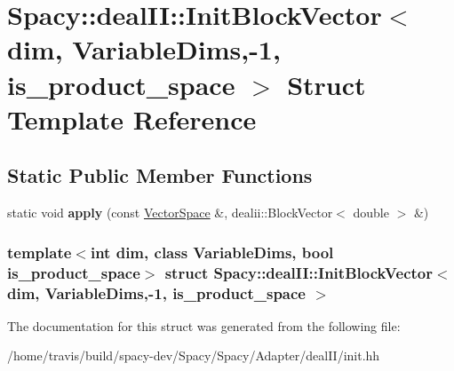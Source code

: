 \hypertarget{structSpacy_1_1dealII_1_1InitBlockVector_3_01dim_00_01VariableDims_00-1_00_01is__product__space_01_4}{\section{\-Spacy\-:\-:deal\-I\-I\-:\-:\-Init\-Block\-Vector$<$ dim, \-Variable\-Dims,-\/1, is\-\_\-product\-\_\-space $>$ \-Struct \-Template \-Reference}
\label{structSpacy_1_1dealII_1_1InitBlockVector_3_01dim_00_01VariableDims_00-1_00_01is__product__space_01_4}
}
\subsection*{\-Static \-Public \-Member \-Functions}
\begin{DoxyCompactItemize}
\item 
\hypertarget{structSpacy_1_1dealII_1_1InitBlockVector_3_01dim_00_01VariableDims_00-1_00_01is__product__space_01_4_aac1a7fc2b92980f823338760b4c1a578}{static void {\bfseries apply} (const \hyperlink{classSpacy_1_1VectorSpace}{\-Vector\-Space} \&, dealii\-::\-Block\-Vector$<$ double $>$ \&)}\label{structSpacy_1_1dealII_1_1InitBlockVector_3_01dim_00_01VariableDims_00-1_00_01is__product__space_01_4_aac1a7fc2b92980f823338760b4c1a578}

\end{DoxyCompactItemize}
\subsubsection*{template$<$int dim, class Variable\-Dims, bool is\-\_\-product\-\_\-space$>$ struct Spacy\-::deal\-I\-I\-::\-Init\-Block\-Vector$<$ dim, Variable\-Dims,-\/1, is\-\_\-product\-\_\-space $>$}



\-The documentation for this struct was generated from the following file\-:\begin{DoxyCompactItemize}
\item 
/home/travis/build/spacy-\/dev/\-Spacy/\-Spacy/\-Adapter/deal\-I\-I/init.\-hh\end{DoxyCompactItemize}
